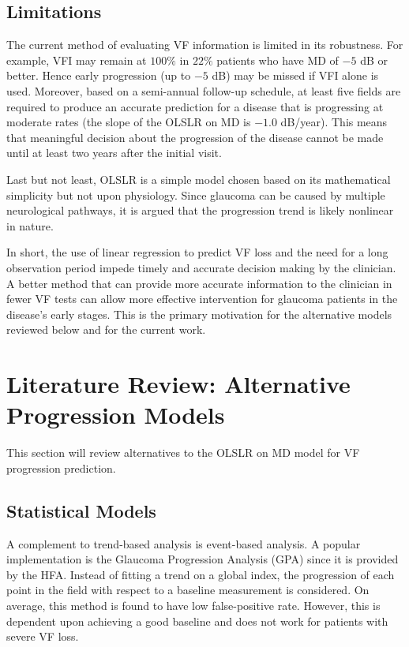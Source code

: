 \subsection{Limitations}

The current method of evaluating \acl{VF} information is limited in its robustness. For example, \ac{VFI} may remain at $100\%$ in $22\%$ patients who have MD of $-5$ dB or better. Hence early progression (up to $-5$ dB) may be missed if VFI alone is used. Moreover, based on a semi-annual follow-up schedule, at least five fields are required to produce an accurate prediction for a disease that is progressing at moderate rates (the slope of the OLSLR on MD is $-1.0$ dB/year). \cite{Chauhan2008} This means that meaningful decision about the progression of the disease cannot be made until at least two years after the initial visit. 

Last but not least, \ac{OLSLR} is a simple model chosen based on its mathematical simplicity but not upon physiology. Since glaucoma can be caused by multiple neurological pathways, it is argued that the progression trend is likely nonlinear in nature. \cite{Pathak2013} 

In short, the use of linear regression to predict \acl{VF} loss and the need for a long observation period impede timely and accurate decision making by the clinician. A better method that can provide more accurate information to the clinician in fewer \acl{VF} tests can allow more effective intervention for glaucoma patients in the disease's early stages. This is the primary motivation for the alternative models reviewed below and for the current work.

\section{Literature Review: Alternative Progression Models}

This section will review alternatives to the \ac{OLSLR} on MD model for \acl{VF} progression prediction. 

\subsection{Statistical Models}

A complement to trend-based analysis is event-based analysis. A popular implementation is the Glaucoma Progression Analysis (GPA) since it is provided by the \ac{HFA}. Instead of fitting a trend on a global index, the progression of each point in the field with respect to a baseline measurement is considered. On average, this method is found to have low false-positive rate. However, this is dependent upon achieving a good baseline and does not work for patients with severe \acl{VF} loss. \cite{Aref2017}

